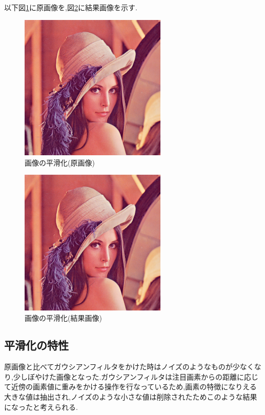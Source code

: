 \documentclass{jarticle}
\begin{document}
以下図\ref{fig:cvkadai03-gen}に原画像を,図\ref{fig:cvkadai03-kekka}に結果画像を示す.

\begin{figure}[H]
\begin{center}
\includegraphics[width=7.0cm]{cv_kadai03/lena.png}
\caption{画像の平滑化(原画像)}
\label{fig:cvkadai03-gen}
\end{center}
\end{figure}


\begin{figure}[H]
\begin{center}
\includegraphics[width=7.0cm]{cv_kadai03/output.bmp}
\caption{画像の平滑化(結果画像)}
\label{fig:cvkadai03-kekka}
\end{center}
\end{figure}


\subsection{平滑化の特性}
原画像と比べてガウシアンフィルタをかけた時はノイズのようなものが少なくなり,少しぼやけた画像となった.ガウシアンフィルタは注目画素からの距離に応じて近傍の画素値に重みをかける操作を行なっているため,画素の特徴になりえる大きな値は抽出され,ノイズのような小さな値は削除されたためこのような結果になったと考えられる.
\end{document}
